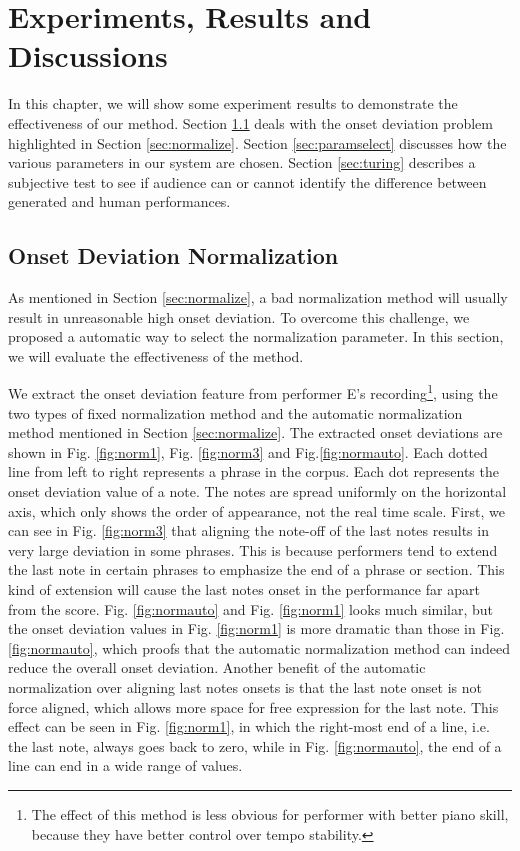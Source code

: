 \chapter{Experiments, Results and Discussions}
\label{chap:exp}
In this chapter, we will show some experiment results to demonstrate the effectiveness of our method. Section \ref{sec:onsetnormexp} deals with the onset deviation problem highlighted in Section \ref{sec:normalize}. Section \ref{sec:paramselect} discusses how the various parameters in our system are chosen. Section \ref{sec:turing} describes a subjective test to see if audience can or cannot identify the difference between generated and human performances.


\section{Onset Deviation Normalization}
\label{sec:onsetnormexp}
As mentioned in Section \ref{sec:normalize}, a bad normalization method will usually result in unreasonable high onset deviation. To overcome this challenge, we proposed a automatic way to select the normalization parameter. In this section, we will evaluate the effectiveness of the method. 

We extract the onset deviation feature from performer E's recording\footnote{The effect of this method is less obvious for performer with better piano skill, because they have better control over tempo stability.}, using the two types of fixed normalization method and the automatic normalization method mentioned in Section \ref{sec:normalize}. The extracted onset deviations are shown in Fig. \ref{fig:norm1}, Fig. \ref{fig:norm3} and Fig.\ref{fig:normauto}. Each dotted line from left to right represents a phrase in the corpus. Each dot represents the onset deviation value of a note. The notes are spread uniformly  on the horizontal axis, which only shows the order of appearance, not the real time scale. First, we can see in Fig. \ref{fig:norm3} that aligning the note-off of the last notes results in very large deviation in some phrases. This is because performers tend to extend the last note in certain phrases to emphasize the end of a phrase or section. This kind of extension will cause the last notes onset in the performance far apart from the score. Fig. \ref{fig:normauto} and Fig. \ref{fig:norm1} looks much similar, but the onset deviation values in Fig. \ref{fig:norm1} is more dramatic than those in Fig. \ref{fig:normauto}, which proofs that the automatic normalization method can indeed reduce the overall onset deviation. Another benefit of the automatic normalization over aligning last notes onsets is that the last note onset is not force aligned, which allows more space for free expression for the last note. This effect can be seen in Fig. \ref{fig:norm1}, in which the right-most end of a line, i.e. the last note, always goes back to zero, while in Fig. \ref{fig:normauto}, the end of a line can end in a wide range of values.


